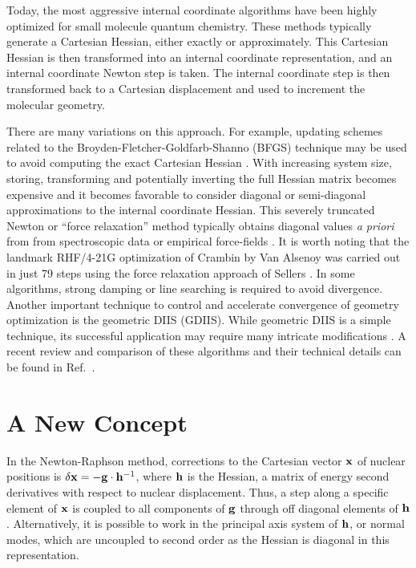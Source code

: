 \documentclass[prl,twocolumn,showpacs,twocolumngrid,superbib]{revtex4}
\begin{document}
Today, the most aggressive internal coordinate algorithms have been highly optimized for 
small molecule quantum chemistry.  These methods typically generate a Cartesian Hessian,
either exactly or approximately. This Cartesian Hessian is then transformed into an internal 
coordinate representation, and an internal coordinate Newton step is taken. The internal 
coordinate step is then transformed back to a Cartesian displacement and used to increment the 
molecular geometry.

There are many variations on this approach.  For example, updating schemes related 
to the Broyden-Fletcher-Goldfarb-Shanno (BFGS) technique \cite{RFletcher} may be used 
to avoid computing the exact Cartesian Hessian \cite{}.  With increasing system size, storing,
transforming and potentially inverting the full Hessian matrix becomes expensive and it becomes
favorable to consider diagonal or semi-diagonal approximations to the internal coordinate Hessian. 
This severely truncated Newton or  ``force relaxation'' method typically obtains diagonal values 
{\em a priori} from from spectroscopic data or empirical force-fields 
\cite{pulay_69,pulay_review,sellers,fogarasi_diaghess,Pulay_natural_internals,van_alsenoy_98,lindh}.
It is worth noting that the landmark RHF/4-21G optimization of Crambin by Van Alsenoy \cite{van_alsenoy_98}
was carried out in just 79 steps using the force relaxation approach of Sellers \cite{sellers}.
In some algorithms, strong damping \cite{sellers} or line searching \cite{sclegel_linesearch}
is required to avoid divergence. 
Another important technique to control and accelerate convergence of geometry optimization 
is the geometric DIIS \cite{Pulay_GDIIS} (GDIIS). While geometric DIIS is a simple technique, 
its successful application may require many intricate modifications \cite{Farkas_GDIIS}.  A recent 
review and comparison of these algorithms and their technical details can be found in Ref.~\cite{bakken}.  

\section{A New Concept}

In the Newton-Raphson method, corrections to the Cartesian vector $\bf x$ of nuclear positions 
is $\delta {\bf x}  = - {\bf g}\cdot {\bf h}^{-1}$,  where $\bf h$ is the Hessian, a matrix of 
energy second derivatives with respect to nuclear displacement.  Thus, a step along a specific 
element of $\bf x$ is coupled to all components of $\bf g$ through off diagonal elements of $\bf h$.  
Alternatively, it is possible to work in the principal axis system of $\bf h$, or normal modes, 
which are uncoupled to second order as the Hessian is diagonal in this representation. 
\end{document}
